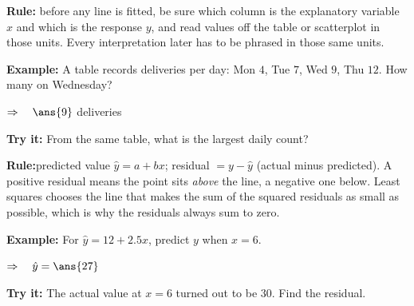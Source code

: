 \documentclass[12pt]{article}
\begin{document}


\begin{formulabox}
\textbf{Rule:} before any line is fitted, be sure which column is the explanatory variable
$x$ and which is the response $y$, and read values off the table or scatterplot in those
units. Every interpretation later has to be phrased in those same units.
\end{formulabox}

\begin{examplebox}
\textbf{Example:} \quad A table records deliveries per day: Mon $4$, Tue $7$, Wed $9$, Thu $12$. How many on Wednesday?

$\Rightarrow\quad \ans{9}$ deliveries
\end{examplebox}

\begin{tryitbox}
\textbf{Try it:} \quad From the same table, what is the largest daily count?\\[2pt]
\end{tryitbox}


\begin{formulabox}
\textbf{Rule:}\quad predicted value $\hat{y} = a + bx$; \quad residual $= y - \hat{y}$
(actual minus predicted). A positive residual means the point sits \emph{above} the line, a
negative one below. Least squares chooses the line that makes the sum of the squared residuals
as small as possible, which is why the residuals always sum to zero.
\end{formulabox}

\begin{examplebox}
\textbf{Example:} \quad For $\hat{y} = 12 + 2.5x$, predict $y$ when $x = 6$.

$\Rightarrow\quad \hat{y} = \ans{27}$
\end{examplebox}

\begin{tryitbox}
\textbf{Try it:} \quad The actual value at $x = 6$ turned out to be $30$. Find the residual.\\[2pt]
\end{tryitbox}
\end{document}
